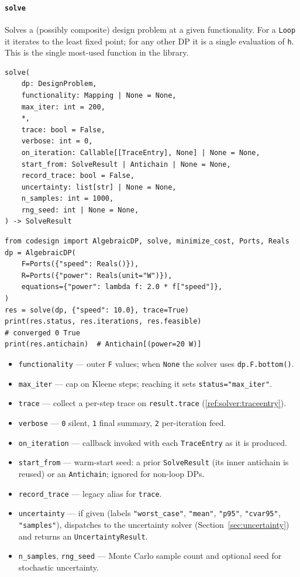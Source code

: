 \documentclass[11pt,a4paper]{article}
\begin{document}
\paragraph{\texttt{solve}}
\label{ref:solver:solve}
Solves a (possibly composite) design problem at a given functionality.
For a \texttt{Loop} it iterates to the least fixed point; for any other
DP it is a single evaluation of \texttt{h}. This is the single
most-used function in the library.
\begin{lstlisting}
solve(
    dp: DesignProblem,
    functionality: Mapping | None = None,
    max_iter: int = 200,
    *,
    trace: bool = False,
    verbose: int = 0,
    on_iteration: Callable[[TraceEntry], None] | None = None,
    start_from: SolveResult | Antichain | None = None,
    record_trace: bool = False,
    uncertainty: list[str] | None = None,
    n_samples: int = 1000,
    rng_seed: int | None = None,
) -> SolveResult
\end{lstlisting}
\begin{lstlisting}
from codesign import AlgebraicDP, solve, minimize_cost, Ports, Reals
dp = AlgebraicDP(
    F=Ports({"speed": Reals()}),
    R=Ports({"power": Reals(unit="W")}),
    equations={"power": lambda f: 2.0 * f["speed"]},
)
res = solve(dp, {"speed": 10.0}, trace=True)
print(res.status, res.iterations, res.feasible)
# converged 0 True
print(res.antichain)  # Antichain[(power=20 W)]
\end{lstlisting}
\begin{itemize}[nosep]
  \item \texttt{functionality} --- outer \texttt{F} values; when
        \texttt{None} the solver uses \texttt{dp.F.bottom()}.
  \item \texttt{max\_iter} --- cap on Kleene steps; reaching it sets
        \texttt{status="max\_iter"}.
  \item \texttt{trace} --- collect a per-step trace on
        \texttt{result.trace} (\ref{ref:solver:traceentry}).
  \item \texttt{verbose} --- \texttt{0} silent, \texttt{1} final summary,
        \texttt{2} per-iteration feed.
  \item \texttt{on\_iteration} --- callback invoked with each
        \texttt{TraceEntry} as it is produced.
  \item \texttt{start\_from} --- warm-start seed: a prior
        \texttt{SolveResult} (its inner antichain is reused) or an
        \texttt{Antichain}; ignored for non-loop DPs.
  \item \texttt{record\_trace} --- legacy alias for \texttt{trace}.
  \item \texttt{uncertainty} --- if given (labels
        \texttt{"worst\_case"}, \texttt{"mean"}, \texttt{"p95"},
        \texttt{"cvar95"}, \texttt{"samples"}), dispatches to the
        uncertainty solver (Section~\ref{sec:uncertainty}) and returns an
        \texttt{UncertaintyResult}.
  \item \texttt{n\_samples}, \texttt{rng\_seed} --- Monte Carlo sample
        count and optional seed for stochastic uncertainty.
\end{itemize}
\end{document}
